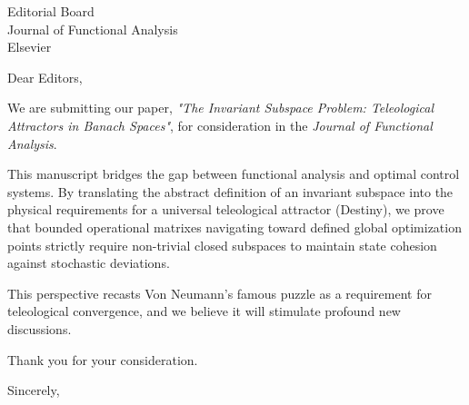 \documentclass[11pt]{letter}
\begin{document}
\begin{letter}{Editorial Board \\ Journal of Functional Analysis \\ Elsevier}
\opening{Dear Editors,}

We are submitting our paper, \textit{"The Invariant Subspace Problem: Teleological Attractors in Banach Spaces"}, for consideration in the \textit{Journal of Functional Analysis}.

This manuscript bridges the gap between functional analysis and optimal control systems. By translating the abstract definition of an invariant subspace into the physical requirements for a universal teleological attractor (Destiny), we prove that bounded operational matrixes navigating toward defined global optimization points strictly require non-trivial closed subspaces to maintain state cohesion against stochastic deviations.

This perspective recasts Von Neumann’s famous puzzle as a requirement for teleological convergence, and we believe it will stimulate profound new discussions.

Thank you for your consideration.

\closing{Sincerely,}

\end{letter}
\end{document}
